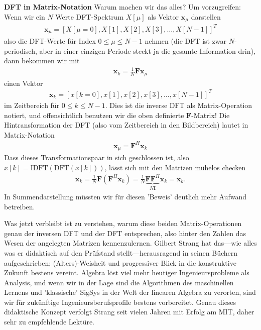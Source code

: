 \textbf{DFT in Matrix-Notation}
Warum machen wir das alles? Um vorzugreifen:
%
Wenn wir ein $N$ Werte DFT-Spektrum $X[\mu]$ als Vektor $\bm{x}_\mu$ darstellen
\begin{align}
\bm{x}_\mu = [X[\mu=0],X[1],X[2],X[3],\dots,X[N-1]]^T
\end{align}
also die DFT-Werte für Index $0 \leq \mu \leq N-1$ nehmen
(die DFT ist zwar $N$-periodisch,
aber in einer einzigen Periode steckt ja die gesamte Information drin),
dann bekommen wir mit
\begin{align}
\bm{x}_k = \frac{1}{N} \bm{F} \bm{x}_\mu
\end{align}
einen Vektor
\begin{align}
\bm{x}_k = [x[k=0],x[1], x[2], x[3], \dots, x[N-1]]^T
\end{align}
im Zeitbereich für $0 \leq k \leq N-1$.
Dies ist die inverse DFT als Matrix-Operation notiert, und offensichtlich
benutzen wir die oben definierte $\bm{F}$-Matrix!
%
Die Hintransformation der DFT
(also vom Zeitbereich in den Bildbereich) lautet in Matrix-Notation
\begin{align}
\bm{x}_\mu = \bm{F}^H \bm{x}_k
\end{align}
%
Dass dieses Transformationspaar in sich geschlossen ist, also
$x[k] = \text{IDFT}(\text{DFT}(x[k]))$,
lässt sich mit den Matrizen mühelos checken
\begin{align}
\bm{x}_k =
\frac{1}{N} \bm{F} (\bm{F}^H \bm{x}_k)=
\frac{1}{N} \underbrace{\bm{F} \bm{F}^H}_{N \bm{I}} \bm{x}_k = \bm{x}_k.
\end{align}
In Summendarstellung müssten wir für diesen 'Beweis' deutlich mehr Aufwand
betreiben.

Was jetzt verbleibt ist zu verstehen, warum diese beiden Matrix-Operationen
genau der inversen DFT und der DFT entsprechen, also hinter den Zahlen
das Wesen der angelegten Matrizen kennenzulernen.
%
Gilbert Strang hat das---wie alles was er didaktisch auf den Prüfstand
stellt---herausragend in seinen Büchern
\cite{Strang2010, Strang2016, Strang2019}
aufgeschrieben; (Alters)-Weisheit und progressiver Blick in die konstruktive
Zukunft bestens vereint. Algebra löst viel
mehr heutiger Ingenieursprobleme als Analysis, und wenn wir in der Lage sind
die Algorithmen des maschinellen Lernens und 'klassische' SigSys in der Welt
der linearen Algebra zu verorten, sind wir für zukünftige Ingenieursberufsprofile
bestens vorbereitet. Genau dieses didaktische Konzept verfolgt Strang seit vielen
Jahren mit Erfolg am MIT, daher sehr zu empfehlende Lektüre.

